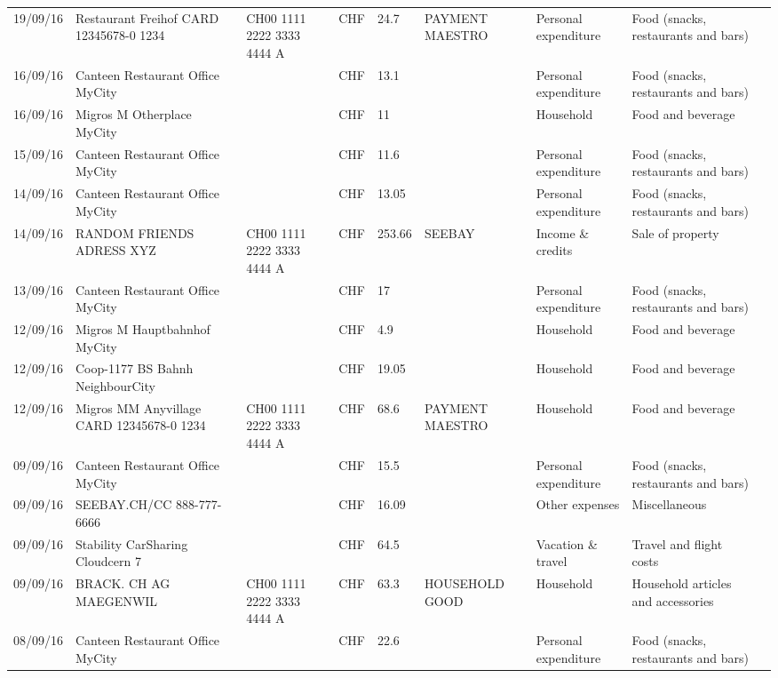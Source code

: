\begin{landscape}
\begin{tiny}
\begin{longtable}{lp{4cm}llllp{3cm}ll}
		    19/09/16 & Restaurant Freihof CARD 12345678-0 1234 & CH00 1111 2222 3333 4444 A & CHF   & 24.7  & PAYMENT MAESTRO & Personal expenditure & Food (snacks, restaurants and bars) \\
		    16/09/16 & Canteen Restaurant Office      MyCity &       & CHF   & 13.1  &       & Personal expenditure & Food (snacks, restaurants and bars) \\
		    16/09/16 & Migros M Otherplace   MyCity &       & CHF   & 11    &       & Household & Food and beverage \\
		    15/09/16 & Canteen Restaurant Office      MyCity &       & CHF   & 11.6  &       & Personal expenditure & Food (snacks, restaurants and bars) \\
		    14/09/16 & Canteen Restaurant Office      MyCity &       & CHF   & 13.05 &       & Personal expenditure & Food (snacks, restaurants and bars) \\
		    14/09/16 & RANDOM FRIENDS ADRESS XYZ & CH00 1111 2222 3333 4444 A & CHF   & 253.66 & SEEBAY & Income \& credits & Sale of property \\
		    13/09/16 & Canteen Restaurant Office      MyCity &       & CHF   & 17    &       & Personal expenditure & Food (snacks, restaurants and bars) \\
		    12/09/16 & Migros M Hauptbahnhof    MyCity &       & CHF   & 4.9   &       & Household & Food and beverage \\
		    12/09/16 & Coop-1177 BS Bahnh       NeighbourCity &       & CHF   & 19.05 &       & Household & Food and beverage \\
		    12/09/16 & Migros MM Anyvillage CARD 12345678-0 1234 & CH00 1111 2222 3333 4444 A & CHF   & 68.6  & PAYMENT MAESTRO & Household & Food and beverage \\
		    09/09/16 & Canteen Restaurant Office      MyCity &       & CHF   & 15.5  &       & Personal expenditure & Food (snacks, restaurants and bars) \\
		    09/09/16 & SEEBAY.CH/CC               888-777-6666 &       & CHF   & 16.09 &       & Other expenses & Miscellaneous \\
		    09/09/16 & Stability CarSharing      Cloudcern 7 &       & CHF   & 64.5  &       & Vacation \& travel & Travel and flight costs \\
		    09/09/16 & BRACK. CH AG MAEGENWIL & CH00 1111 2222 3333 4444 A & CHF   & 63.3  & HOUSEHOLD GOOD & Household & Household articles and accessories \\
		    08/09/16 & Canteen Restaurant Office      MyCity &       & CHF   & 22.6  &       & Personal expenditure & Food (snacks, restaurants and bars) \\

\end{longtable}
\end{tiny}
\end{landscape}
